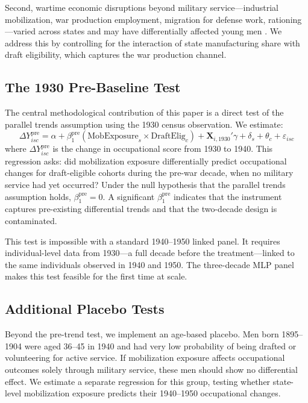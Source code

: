 \documentclass[12pt]{article}
\begin{document}
Second, wartime economic disruptions beyond military service---industrial mobilization, war production employment, migration for defense work, rationing---varied across states and may have differentially affected young men \citep{goldin2000}. We address this by controlling for the interaction of state manufacturing share with draft eligibility, which captures the war production channel.

\subsection{The 1930 Pre-Baseline Test}

The central methodological contribution of this paper is a direct test of the parallel trends assumption using the 1930 census observation. We estimate:
\begin{equation}
\Delta Y_{isc}^{\text{pre}} = \alpha + \beta_1^{\text{pre}} (\text{MobExposure}_s \times \text{DraftElig}_c) + \mathbf{X}_{i,1930}' \gamma + \delta_s + \theta_c + \varepsilon_{isc}
\label{eq:pretrend}
\end{equation}
where $\Delta Y_{isc}^{\text{pre}}$ is the change in occupational score from 1930 to 1940. This regression asks: did mobilization exposure differentially predict occupational changes for draft-eligible cohorts during the pre-war decade, when no military service had yet occurred? Under the null hypothesis that the parallel trends assumption holds, $\beta_1^{\text{pre}} = 0$. A significant $\beta_1^{\text{pre}}$ indicates that the instrument captures pre-existing differential trends and that the two-decade design is contaminated.

This test is impossible with a standard 1940--1950 linked panel. It requires individual-level data from 1930---a full decade before the treatment---linked to the same individuals observed in 1940 and 1950. The three-decade MLP panel makes this test feasible for the first time at scale.

\subsection{Additional Placebo Tests}

Beyond the pre-trend test, we implement an age-based placebo. Men born 1895--1904 were aged 36--45 in 1940 and had very low probability of being drafted or volunteering for active service. If mobilization exposure affects occupational outcomes solely through military service, these men should show no differential effect. We estimate a separate regression for this group, testing whether state-level mobilization exposure predicts their 1940--1950 occupational changes.
\end{document}
